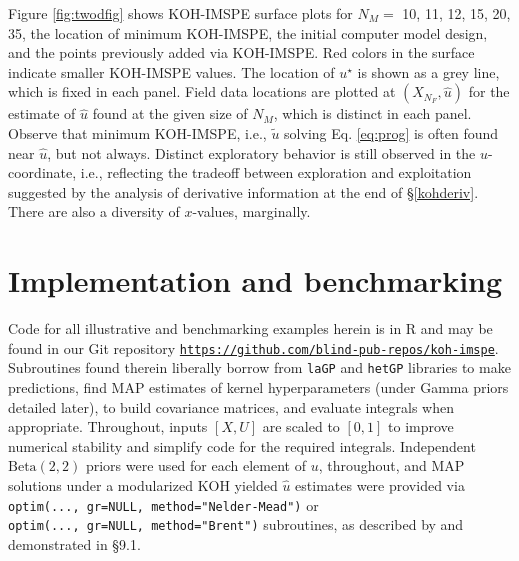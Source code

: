 \documentclass[
]{article}
\begin{document}
Figure \ref{fig:twodfig} shows KOH-IMSPE surface plots for \(N_M =\)
10, 11, 12, 15, 20, 35, the location of minimum KOH-IMSPE, the initial
computer model design, and the points previously added via KOH-IMSPE. Red colors in the surface indicate smaller KOH-IMSPE values. The location of
\(u^\star\) is shown as a grey line, which is fixed in each panel. Field data locations are plotted at \((X_{N_F}, \hat{u})\) for the estimate of \(\hat{u}\) found at the given size of \(N_M\), which is distinct in each panel.
Observe that minimum KOH-IMSPE, i.e., \(\tilde{u}\) solving Eq. \eqref{eq:prog} is often found near \(\hat{u}\), but not always. Distinct exploratory behavior is still observed in the \(u\)-coordinate, i.e., reflecting the tradeoff between exploration and exploitation suggested by the analysis of derivative information at the end of \S \ref{kohderiv}. There are also a diversity of \(x\)-values, marginally.

\hypertarget{implementation}{%
\section{Implementation and benchmarking}\label{implementation}}

Code for all illustrative and
benchmarking examples herein is in \textsf{R} and may be found in our Git
repository \href{https://github.com/blind-pub-repos/koh-imspe}{\texttt{https://github.com/blind-pub-repos/koh-imspe}}. Subroutines found therein liberally borrow
from \texttt{laGP} \citep{gramacy2016lagp} and \texttt{hetGP} \citep{hetGP}
libraries to make predictions, find MAP estimates of kernel hyperparameters (under Gamma priors detailed later), to build
covariance matrices, and evaluate integrals when appropriate. Throughout, inputs \([X,U]\) are scaled to \([0,1]\) to improve numerical stability and simplify code for the required integrals. Independent \(\mathrm{Beta}(2,2)\) priors were used for each element of \(u\), throughout, and MAP solutions under a modularized KOH \citet{bayarri2007framework} yielded \(\hat{u}\) estimates were provided via \texttt{optim(...,\ gr=NULL,\ method="Nelder-Mead")} \citep{nelder1965simplex} or \texttt{optim(...,\ gr=NULL,\ method="Brent")} \citep{brent2013algorithms} subroutines, as described by \citet{gra:etal:2015}
and demonstrated in \citet{gramacy2020surrogates} \S 9.1.
\end{document}
